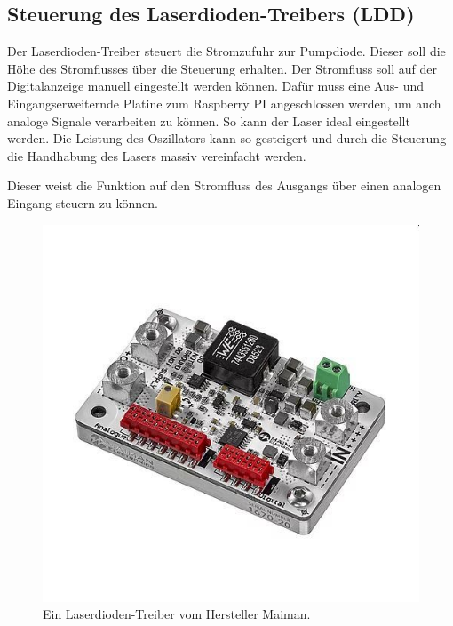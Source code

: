 \subsection{Steuerung des Laserdioden-Treibers (LDD)}
Der Laserdioden-Treiber steuert die Stromzufuhr zur Pumpdiode. Dieser soll die Höhe des Stromflusses über die Steuerung erhalten. Der Stromfluss soll auf der Digitalanzeige manuell eingestellt werden können. Dafür muss eine Aus- und Eingangserweiternde Platine zum Raspberry PI angeschlossen werden, um auch analoge Signale verarbeiten zu können.
So kann der Laser ideal eingestellt werden. Die Leistung des Oszillators kann so gesteigert und durch die Steuerung die Handhabung des Lasers massiv vereinfacht werden.

Dieser weist die Funktion auf den Stromfluss des Ausgangs über einen analogen Eingang steuern zu können.

\begin{figure}[H]
    \centering
    \includegraphics[scale=0.5, trim={0 30mm 0 40mm},clip]{98_images/SF6015.jpg}
    \caption{Ein Laserdioden-Treiber vom Hersteller Maiman.}
    \label{fig:ldd}
\end{figure}

